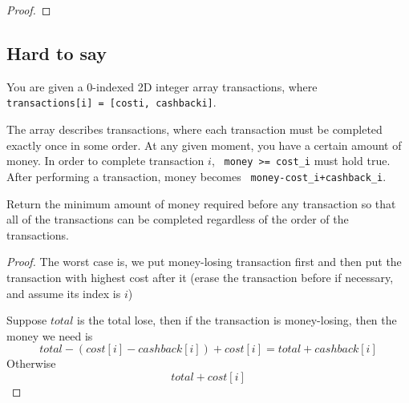 \documentclass[11pt]{article}
\let\OldTexttt\texttt
\renewcommand{\texttt}[1]{\OldTexttt{\color{MidnightBlue} #1}}
\begin{document}
\begin{proof}

\end{proof}

\subsection{Hard to say}
\label{sec:org6ddb10e}
\begin{problem}
You are given a 0-indexed 2D integer array transactions, where \texttt{transactions[i] = [costi, cashbacki]}.

The array describes transactions, where each transaction must be completed exactly once in some
order. At any given moment, you have a certain amount of money. In order to complete transaction
\(i\), \texttt{money >= cost\_i} must hold true. After performing a transaction, money becomes \texttt{money-cost\_i+cashback\_i}.

Return the minimum amount of money required before any transaction so that all of the
transactions can be completed regardless of the order of the transactions.
\end{problem}

\begin{proof}
The worst case is, we put money-losing transaction first and then put the transaction with
highest cost after it (erase the transaction before if necessary, and assume its index is \(i\))

Suppose \(total\) is the total lose, then if the transaction is money-losing, then the money we need is
\begin{equation*}
total-(cost[i]-cashback[i])+cost[i] = total+cashback[i]
\end{equation*}
Otherwise
\begin{equation*}
total+cost[i]
\end{equation*}
\end{proof}
\end{document}
